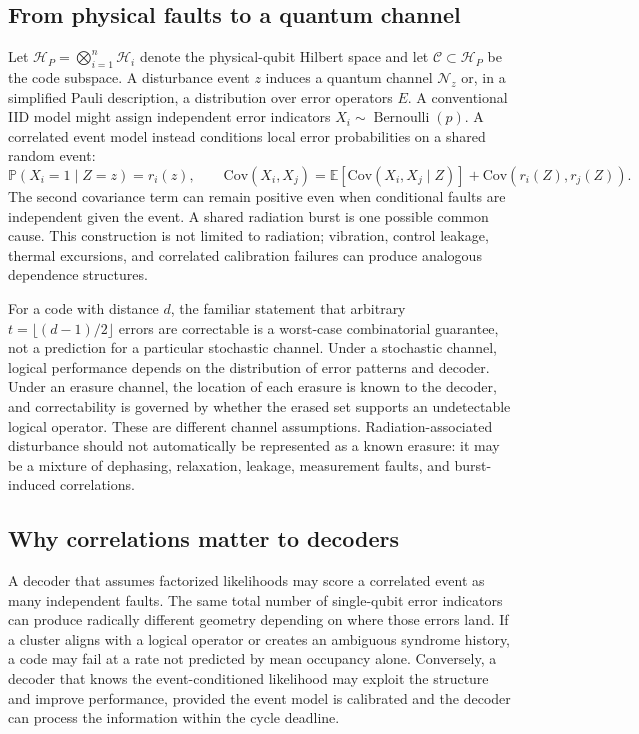 \documentclass[11pt,a4paper,oneside]{article}
\newcommand{\E}{\mathbb{E}}\newcommand{\Pp}{\mathbb{P}}\newcommand{\R}{\mathbb{R}}\newcommand{\N}{\mathbb{N}}\newcommand{\cX}{\mathcal{X}}\newcommand{\cE}{\mathcal{E}}\newcommand{\cF}{\mathcal{F}}\newcommand{\cS}{\mathcal{S}}\newcommand{\cD}{\mathcal{D}}\newcommand{\cR}{\mathcal{R}}\newcommand{\cC}{\mathcal{C}}\newcommand{\cL}{\mathcal{L}}\newcommand{\cN}{\mathcal{N}}\newcommand{\dd}{\,\mathrm{d}}\newcommand{\Prob}{\mathrm{Pr}}\newcommand{\Var}{\mathrm{Var}}\newcommand{\Cov}{\mathrm{Cov}}\newcommand{\diag}{\mathrm{diag}}\newcommand{\tr}{\mathrm{tr}}\newcommand{\argmin}{\operatorname*{arg\,min}}\newcommand{\argmax}{\operatorname*{arg\,max}}
\begin{document}
\subsection{From physical faults to a quantum channel}
Let \(\mathcal{H}_P=\bigotimes_{i=1}^{n}\mathcal{H}_i\) denote the physical-qubit Hilbert space and let \(\mathcal{C}\subset\mathcal{H}_P\) be the code subspace. A disturbance event \(z\) induces a quantum channel \(\mathcal{N}_z\) or, in a simplified Pauli description, a distribution over error operators \(E\). A conventional IID model might assign independent error indicators \(X_i\sim\operatorname{Bernoulli}(p)\). A correlated event model instead conditions local error probabilities on a shared random event:
\begin{equation}\label{eq:conditional-error}
\Pp(X_i=1\mid Z=z)=r_i(z),\qquad \Cov(X_i,X_j)=\E[\Cov(X_i,X_j\mid Z)]+\Cov(r_i(Z),r_j(Z)).
\end{equation}
The second covariance term can remain positive even when conditional faults are independent given the event. A shared radiation burst is one possible common cause. This construction is not limited to radiation; vibration, control leakage, thermal excursions, and correlated calibration failures can produce analogous dependence structures.

For a code with distance \(d\), the familiar statement that arbitrary \(t=\lfloor(d-1)/2\rfloor\) errors are correctable is a worst-case combinatorial guarantee, not a prediction for a particular stochastic channel. Under a stochastic channel, logical performance depends on the distribution of error patterns and decoder. Under an erasure channel, the location of each erasure is known to the decoder, and correctability is governed by whether the erased set supports an undetectable logical operator. These are different channel assumptions. Radiation-associated disturbance should not automatically be represented as a known erasure: it may be a mixture of dephasing, relaxation, leakage, measurement faults, and burst-induced correlations.

\subsection{Why correlations matter to decoders}
A decoder that assumes factorized likelihoods may score a correlated event as many independent faults. The same total number of single-qubit error indicators can produce radically different geometry depending on where those errors land. If a cluster aligns with a logical operator or creates an ambiguous syndrome history, a code may fail at a rate not predicted by mean occupancy alone. Conversely, a decoder that knows the event-conditioned likelihood may exploit the structure and improve performance, provided the event model is calibrated and the decoder can process the information within the cycle deadline.
\end{document}
